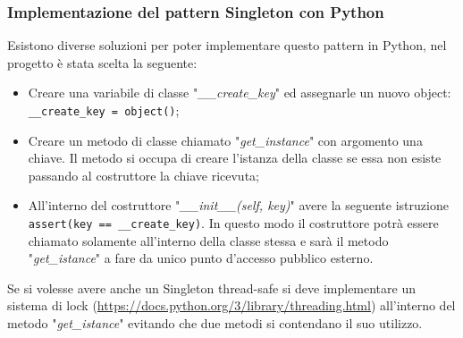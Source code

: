 \subsubsection{Implementazione del pattern Singleton con Python}
\label{sec:singleton-python}
Esistono diverse soluzioni per poter implementare questo pattern in Python, nel progetto è stata scelta la seguente:
\begin{itemize}
    \item Creare una variabile di classe "\textit{\_\_create\_key}" ed assegnarle un nuovo object: \texttt{\_\_create\_key = object()};
    \item Creare un metodo di classe chiamato "\textit{get\_instance}" con argomento una chiave. Il metodo si occupa di creare l'istanza della classe se essa non esiste passando al costruttore la chiave ricevuta;
    \item All'interno del costruttore "\textit{\_\_init\_\_(self, key)}" avere la seguente istruzione \texttt{assert(key == \_\_create\_key)}. In questo modo il costruttore potrà essere chiamato solamente all'interno della classe stessa e sarà il metodo "\textit{get\_istance}" a fare da unico punto d'accesso pubblico esterno.
\end{itemize}
Se si volesse avere anche un Singleton thread-safe si deve implementare un sistema di lock (\url{https://docs.python.org/3/library/threading.html}) all'interno del metodo "\textit{get\_istance}" evitando che due metodi si contendano il suo utilizzo.

